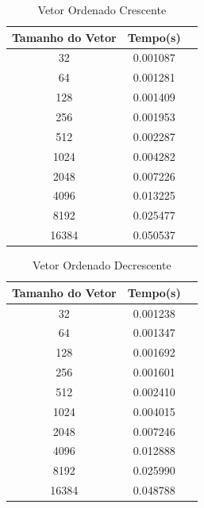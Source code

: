 \documentclass[12pt,a4paper,twoside]{report}
\begin{document}
\begin{table}[h]
  \centering
  \caption{Vetor Ordenado Crescente \label{tab:oc}}
  \begin{tabular}{ccc} \\\hline
  \textbf{Tamanho do Vetor}  & \textbf{Tempo(s)} \\\hline
  32                              & 0.001087          \\\hline
  64                              & 0.001281          \\\hline
  128                             & 0.001409          \\\hline
  256                             & 0.001953          \\\hline
  512                             & 0.002287          \\\hline
  1024                            & 0.004282          \\\hline
  2048                            & 0.007226          \\\hline
  4096                            & 0.013225         \\\hline
  8192                            & 0.025477         \\\hline
  16384                           & 0.050537
  \\\hline
  \end{tabular}
\end{table}


\begin{table}[h]
  \centering
  \caption{Vetor Ordenado Decrescente \label{tab:od}}
  \begin{tabular}{ccc} \\\hline
  \textbf{Tamanho do Vetor}  & \textbf{Tempo(s)} \\\hline
  32                              & 0.001238          \\\hline
  64                              & 0.001347          \\\hline
  128                             & 0.001692          \\\hline
  256                             & 0.001601          \\\hline
  512                             & 0.002410          \\\hline
  1024                            & 0.004015          \\\hline
  2048                            & 0.007246          \\\hline
  4096                            & 0.012888         \\\hline
  8192                            & 0.025990         \\\hline
  16384                           & 0.048788
  \\\hline
  \end{tabular}
\end{table}
\end{document}
